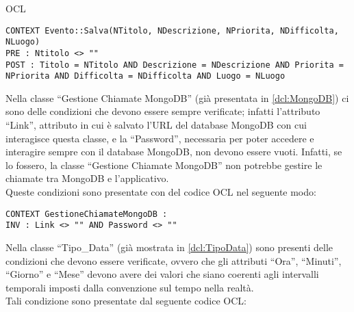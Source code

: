 \begin{listaPersonale}{OCL}
    \begin{lstlisting}
CONTEXT Evento::Salva(NTitolo, NDescrizione, NPriorita, NDifficolta, NLuogo)
PRE : Ntitolo <> ""
POST : Titolo = NTitolo AND Descrizione = NDescrizione AND Priorita = NPriorita AND Difficolta = NDifficolta AND Luogo = NLuogo 
    \end{lstlisting}




    \begin{center}
        
    \end{center}
    Nella classe “Gestione Chiamate MongoDB” (già presentata in \ref{dcl:MongoDB}) ci sono delle condizioni che devono essere sempre verificate; infatti l’attributo “Link”, attributo in cui è salvato l’URL del database MongoDB con cui interagisce questa classe, e la “Password”, necessaria per poter accedere e interagire sempre con il database MongoDB, non devono essere vuoti. Infatti, se lo fossero, la classe “Gestione Chiamate MongoDB” non potrebbe gestire le chiamate tra MongoDB e l’applicativo.\\
    Queste condizioni sono presentate con del codice OCL nel seguente modo:

    \begin{lstlisting}
CONTEXT GestioneChiamateMongoDB :
INV : Link <> "" AND Password <> "" 
    \end{lstlisting}




    \begin{center}
        
    \end{center}
    Nella classe “Tipo\_Data” (già mostrata in \ref{dcl:TipoData}) sono presenti delle condizioni che devono essere verificate, ovvero che gli attributi “Ora”, “Minuti”, “Giorno” e “Mese” devono avere dei valori che siano coerenti agli intervalli temporali imposti dalla convenzione sul tempo nella realtà.\\
    Tali condizione sono presentate dal seguente codice OCL:


\end{listaPersonale}

